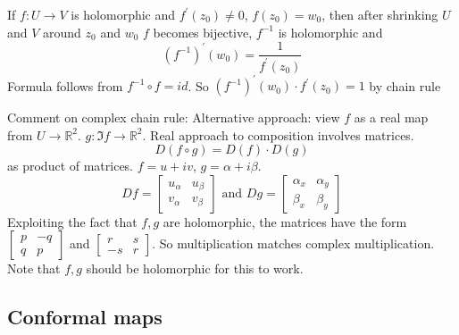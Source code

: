 \documentclass{report}
\begin{document}
If $f: U \rightarrow V$ is holomorphic and $f^{\prime}(z_{0}) \neq 0$, $f(z_{0}) = w_{0}$, then after shrinking $U$ and $V$ around $z_{0}$ and $w_{0}$ $f$ becomes bijective, $f^{-1}$ is holomorphic and 
    \begin{equation*}
        (f^{-1})^{\prime} (w_{0}) = \dfrac{1}{f^{\prime}(z_{0})}
    \end{equation*}
Formula follows from $f^{-1} \circ f = id$. So $(f^{-1})^{\prime}(w_{0}) \cdot f^{\prime}(z_{0}) = 1$ by chain rule

Comment on complex chain rule: Alternative approach: view $f$ as a real map from $U \rightarrow \mathbb{R}^{2}$. $g: \Im{f} \rightarrow \mathbb{R}^{2}$. Real approach to composition involves matrices.
    \begin{equation*}
        D(f \circ g) = D(f) \cdot D(g)
    \end{equation*}
as product of matrices. $f = u + iv$, $g = \alpha + i\beta$. 
    \begin{equation*}
        Df = \begin{bmatrix}
            u_{\alpha} & u_{\beta} \\
            v_{\alpha} & v_{\beta}   
        \end{bmatrix} \text{ and } Dg = \begin{bmatrix}
            \alpha_{x} & \alpha_{y} \\
            \beta_{x}  & \beta_{y}    
        \end{bmatrix}
    \end{equation*}
Exploiting the fact that $f, g$ are holomorphic, the matrices have the form $\begin{bmatrix}
    p & -q \\
    q & p    
\end{bmatrix}$ and $\begin{bmatrix}
    r  & s \\
    -s & r   
\end{bmatrix}$. So multiplication matches complex multiplication. Note that $f, g$ should be holomorphic for this to work.

\begin{topic}
    \section{Conformal maps}
\end{topic}
\end{document}
